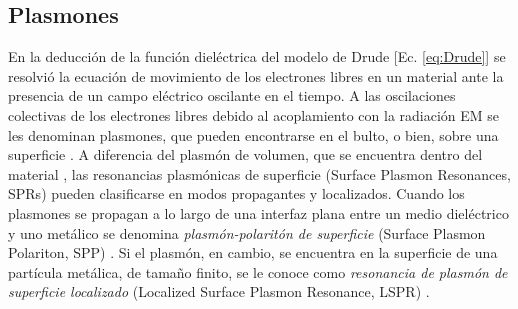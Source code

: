 \subsection{Plasmones}

En la deducción de la función dieléctrica del modelo de Drude [Ec. \eqref{eq:Drude}] se resolvió la ecuación de movimiento de los electrones libres en un material ante la  presencia de un campo eléctrico oscilante en el tiempo. A las oscilaciones colectivas  de los electrones libres debido al acoplamiento con la radiación EM se les denominan  plasmones, que pueden encontrarse en el bulto, o bien, sobre una superficie \cite{stockman2011nanoplasmonics}. A diferencia del plasmón de volumen, que se encuentra dentro del material \cite{maier2007plasmonics}, las resonancias plasmónicas de superficie (Surface Plasmon Resonances, SPRs) pueden clasificarse en modos propagantes y localizados. Cuando los plasmones se propagan a lo largo de una interfaz plana entre un medio diel\'ectrico y uno met\'alico se denomina  \emph{plasm\'on-polarit\'on de superficie} (Surface Plasmon Polariton, SPP) \cite{maier2007plasmonics}.  Si el plasmón, en cambio, se encuentra en la superficie de una partícula  met\'alica, de tamaño finito, se le conoce como \emph{resonancia de plasm\'on de superficie localizado} (Localized Surface Plasmon Resonance, LSPR) \cite{maier2007plasmonics}. 

